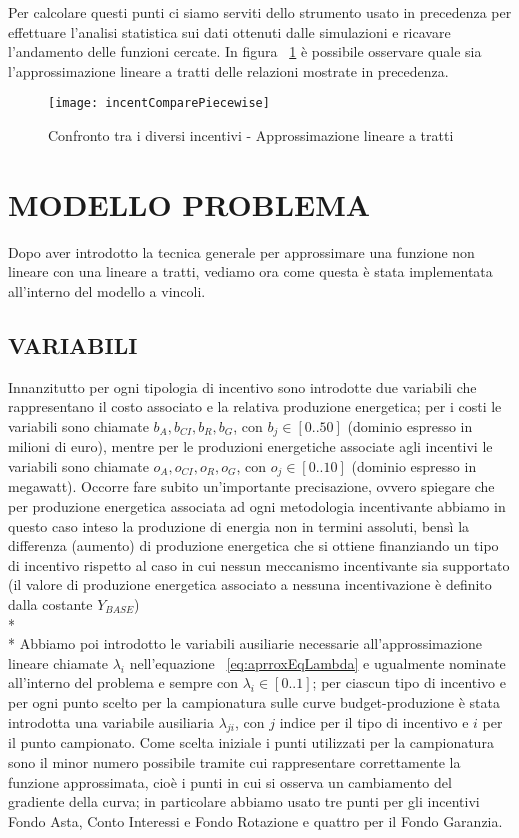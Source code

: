 \documentclass[12pt,a4paper,openright,twoside]{report}
\begin{document}
Per calcolare questi punti ci siamo serviti dello strumento usato in precedenza per effettuare l'analisi statistica sui dati ottenuti dalle simulazioni e ricavare l'andamento delle funzioni cercate.
In figura ~\ref{incentCompare_piecewise} è possibile osservare quale sia l'approssimazione lineare a tratti delle relazioni mostrate in precedenza.
\begin{figure}[hbt]
	\centering
	\texttt{[image: incentComparePiecewise]}
	\caption{Confronto tra i diversi incentivi - Approssimazione lineare a tratti}
	\label{incentCompare_piecewise}
\end{figure}


\section{MODELLO PROBLEMA}

Dopo aver introdotto la tecnica generale per approssimare una funzione non lineare con una lineare a tratti, vediamo ora come questa è stata implementata all'interno del modello a vincoli.

\subsection{VARIABILI}

Innanzitutto per ogni tipologia di incentivo sono introdotte due variabili che rappresentano il costo associato e la relativa produzione energetica; per i costi le variabili sono chiamate $b_A, b_{CI}, b_R, b_G$, con $b_j \in [0..50]$ (dominio espresso in milioni di euro), mentre per le produzioni energetiche associate agli incentivi le variabili sono chiamate $o_A, o_{CI}, o_R, o_G$, con $o_j \in [0..10]$ (dominio espresso in megawatt). Occorre fare subito un'importante precisazione, ovvero spiegare che per produzione energetica associata ad ogni metodologia incentivante abbiamo in questo caso inteso la produzione di energia non in termini assoluti, bensì la differenza (aumento) di produzione energetica che si ottiene finanziando un tipo di incentivo rispetto al caso in cui nessun meccanismo incentivante sia supportato (il valore di produzione energetica associato a nessuna incentivazione è definito dalla costante $Y_{BASE}$)
\\* \\*
Abbiamo poi introdotto le variabili ausiliarie necessarie all'approssimazione lineare chiamate $\lambda_i$ nell'equazione ~\ref{eq:aprroxEqLambda} e ugualmente nominate all'interno del problema e sempre con $\lambda_i \in [0..1]$; per ciascun tipo di incentivo e per ogni punto scelto per la campionatura sulle curve budget-produzione è stata introdotta una variabile ausiliaria $\lambda_{ji}$, con $j$ indice per il tipo di incentivo e $i$ per il punto campionato. Come scelta iniziale i punti utilizzati per la campionatura sono il minor numero possibile tramite cui rappresentare correttamente la funzione approssimata, cioè i punti in cui si osserva un cambiamento del gradiente della curva; in particolare abbiamo usato tre punti per gli incentivi Fondo Asta, Conto Interessi e Fondo Rotazione e quattro per il Fondo Garanzia. 
\end{document}
